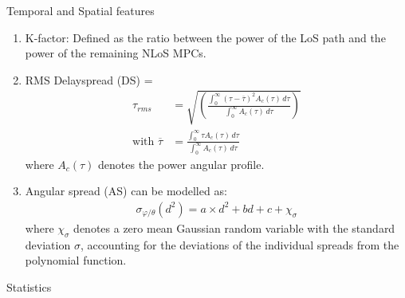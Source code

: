 \documentclass{beamer}
\providecommand{\brak}[1]{\ensuremath{\left(#1\right)}}
\begin{document}
\begin{frame}{Temporal and Spatial features}
\begin{enumerate}
    \item K-factor: Defined as the ratio between the power of the LoS path and the power of the remaining NLoS MPCs.
    \item RMS Delayspread (DS) = 
    \begin{align}
        \tau_{rms} &= \sqrt{\brak{\frac{\int_{0}^{\infty}(\tau-\overline{\tau})^2A_c(\tau) \,d\tau}{\int_{0}^{\infty}A_c(\tau) \,d\tau}}}
        \\ \text{with } \overline{\tau} &= \frac{\int_{0}^{\infty}\tau A_c(\tau) \,d\tau}{\int_{0}^{\infty} A_c(\tau) \,d\tau}
    \end{align}
    where $A_c(\tau)$ denotes the power angular profile.
    \item Angular spread (AS) can be modelled as: 
    \begin{align}
        \sigma_{\varphi/\theta}(d^2) = a\times d^2 + bd + c + \chi_{\sigma}
    \end{align}
    where $\chi_{\sigma}$ denotes a zero mean Gaussian random variable with the standard deviation $\sigma$, accounting for the deviations of the individual spreads from the polynomial function.
\end{enumerate}
\end{frame}
\begin{frame}{Statistics}
\begin{center}
\begin{table}[h]
    \centering
    \caption{Statistics of MPCs for each receiver}
    \label{table 3}
\end{table}
\end{center}
\end{frame}
\end{document}
